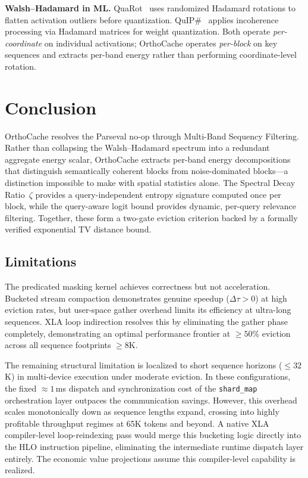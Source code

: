 \documentclass[conference,10pt]{IEEEtran}
\begin{document}
\textbf{Walsh--Hadamard in ML.}
QuaRot~\cite{quarot} uses randomized Hadamard rotations to flatten activation
outliers before quantization. QuIP\#~\cite{quipsharp} applies incoherence
processing via Hadamard matrices for weight quantization. Both operate
\emph{per-coordinate} on individual activations; OrthoCache operates
\emph{per-block} on key sequences and extracts per-band energy rather than
performing coordinate-level rotation.

\section{Conclusion}\label{sec:conclusion}

OrthoCache resolves the Parseval no-op through Multi-Band Sequency Filtering.
Rather than collapsing the Walsh--Hadamard spectrum into a redundant aggregate
energy scalar, OrthoCache extracts per-band energy decompositions that
distinguish semantically coherent blocks from noise-dominated blocks---a
distinction impossible to make with spatial statistics alone. The Spectral Decay
Ratio~$\zeta$ provides a query-independent entropy signature computed once per
block, while the query-aware logit bound provides dynamic, per-query relevance
filtering. Together, these form a two-gate eviction criterion backed by a
formally verified exponential TV distance bound.

\subsection{Limitations}

The predicated masking kernel achieves correctness but not acceleration. Bucketed stream compaction demonstrates genuine speedup ($\Delta\tau > 0$) at high eviction rates, but user-space gather overhead limits its efficiency at ultra-long sequences. XLA loop indirection resolves this by eliminating the gather phase completely, demonstrating an optimal performance frontier at $\geq 50\%$ eviction across all sequence footprints $\geq 8$K.

The remaining structural limitation is localized to short sequence horizons ($\le 32$K) in multi-device execution under moderate eviction. In these configurations, the fixed $\approx 1$\,ms dispatch and synchronization cost of the \texttt{shard\_map} orchestration layer outpaces the communication savings. However, this overhead scales monotonically down as sequence lengths expand, crossing into highly profitable throughput regimes at 65K tokens and beyond. A native XLA compiler-level loop-reindexing pass would merge this bucketing logic directly into the HLO instruction pipeline, eliminating the intermediate runtime dispatch layer entirely.
The economic value projections assume this compiler-level capability is
realized.
\end{document}
